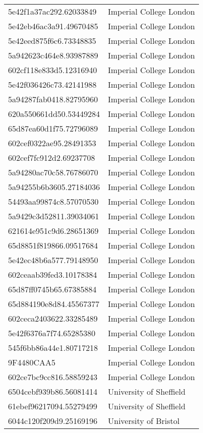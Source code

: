 \begin{tabular}{ll}
5e42f1a37ac292.62033849 & Imperial College London \\
5e42eb46ac3a91.49670485 & Imperial College London \\
5e42eed875f6c6.73348835 & Imperial College London \\
5a942623c464e8.93987889 & Imperial College London \\
602cf118e833d5.12316940 & Imperial College London \\
5e42f036426c73.42141988 & Imperial College London \\
5a94287fab0418.82795960 & Imperial College London \\
620a550661dd50.53449284 & Imperial College London \\
65d87ea60d1f75.72796089 & Imperial College London \\
602cef0322ae95.28491353 & Imperial College London \\
602cef7fc912d2.69237708 & Imperial College London \\
5a94280ac70c58.76786070 & Imperial College London \\
5a94255b6b3605.27184036 & Imperial College London \\
54493aa99874c8.57070530 & Imperial College London \\
5a9429c3d52811.39034061 & Imperial College London \\
621614e951c9d6.28651369 & Imperial College London \\
65d8851f819866.09517684 & Imperial College London \\
5e42ec48b6a577.79148950 & Imperial College London \\
602ceaab39fed3.10178384 & Imperial College London \\
65d87ff0745b65.67385884 & Imperial College London \\
65d884190e8d84.45567377 & Imperial College London \\
602ceca2403622.33285489 & Imperial College London \\
5e42f6376a7f74.65285380 & Imperial College London \\
545f6bb86a44e1.80717218 & Imperial College London \\
9F4480CAA5 & Imperial College London \\
602ce7bc9cc816.58859243 & Imperial College London \\
6504cebf939b86.56081414 & University of Sheffield \\
61ebef96217094.55279499 & University of Sheffield \\
6044c120f209d9.25169196 & University of Bristol \\

\end{tabular}

